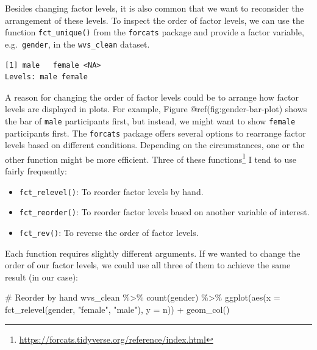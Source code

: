 \documentclass[
  letterpaper,
]{krantz}
\makeatletter
\newenvironment{Shaded}{\begin{snugshade}}{\end{snugshade}}
\newcommand{\AttributeTok}[1]{\textcolor[rgb]{0.40,0.45,0.13}{#1}}
\newcommand{\CommentTok}[1]{\textcolor[rgb]{0.37,0.37,0.37}{#1}}
\newcommand{\FunctionTok}[1]{\textcolor[rgb]{0.28,0.35,0.67}{#1}}
\newcommand{\NormalTok}[1]{\textcolor[rgb]{0.00,0.23,0.31}{#1}}
\newcommand{\SpecialCharTok}[1]{\textcolor[rgb]{0.37,0.37,0.37}{#1}}
\newcommand{\StringTok}[1]{\textcolor[rgb]{0.13,0.47,0.30}{#1}}
\renewcommand{\href}[2]{#2\footnote{\url{#1}}}
\newenvironment{kframe}{%
\medskip{}
\setlength{\fboxsep}{.8em}
 \def\at@end@of@kframe{}%
 \ifinner\ifhmode%
  \def\at@end@of@kframe{\end{minipage}}%
  \begin{minipage}{\columnwidth}%
 \fi\fi%
 \def\FrameCommand##1{\hskip\@totalleftmargin \hskip-\fboxsep
 \colorbox{shadecolor}{##1}\hskip-\fboxsep
     \hskip-\linewidth \hskip-\@totalleftmargin \hskip\columnwidth}%
 \MakeFramed {\advance\hsize-\width
   \@totalleftmargin\z@ \linewidth\hsize
   \@setminipage}}%
 {\par\unskip\endMakeFramed%
 \at@end@of@kframe}
\renewenvironment{Shaded}{\begin{kframe}}{\end{kframe}}
\makeatother
\begin{document}
Besides changing factor levels, it is also common that we want to
reconsider the arrangement of these levels. To inspect the order of
factor levels, we can use the function \texttt{fct\_unique()} from the
\texttt{forcats} package and provide a factor variable,
e.g.~\texttt{gender}, in the \texttt{wvs\_clean} dataset.

\begin{Shaded}
\end{Shaded}

\begin{verbatim}
[1] male   female <NA>  
Levels: male female
\end{verbatim}

A reason for changing the order of factor levels could be to arrange how
factor levels are displayed in plots. For example, Figure
@ref(fig:gender-bar-plot) shows the bar of \texttt{male} participants
first, but instead, we might want to show \texttt{female} participants
first. The \texttt{forcats} package offers several options to rearrange
factor levels based on different conditions. Depending on the
circumstances, one or the other function might be more efficient. Three
of \href{https://forcats.tidyverse.org/reference/index.html}{these
functions} I tend to use fairly frequently:

\begin{itemize}
\item
  \texttt{fct\_relevel()}: To reorder factor levels by hand.
\item
  \texttt{fct\_reorder()}: To reorder factor levels based on another
  variable of interest.
\item
  \texttt{fct\_rev()}: To reverse the order of factor levels.
\end{itemize}

Each function requires slightly different arguments. If we wanted to
change the order of our factor levels, we could use all three of them to
achieve the same result (in our case):

\begin{Shaded}
\begin{Highlighting}[]
\CommentTok{\# Reorder by hand}
\NormalTok{wvs\_clean }\SpecialCharTok{\%\textgreater{}\%}
  \FunctionTok{count}\NormalTok{(gender) }\SpecialCharTok{\%\textgreater{}\%}
  \FunctionTok{ggplot}\NormalTok{(}\FunctionTok{aes}\NormalTok{(}\AttributeTok{x =} \FunctionTok{fct\_relevel}\NormalTok{(gender, }\StringTok{"female"}\NormalTok{, }\StringTok{"male"}\NormalTok{),}
             \AttributeTok{y =}\NormalTok{ n)) }\SpecialCharTok{+}
  \FunctionTok{geom\_col}\NormalTok{()}
\end{Highlighting}
\end{Shaded}
\end{document}

